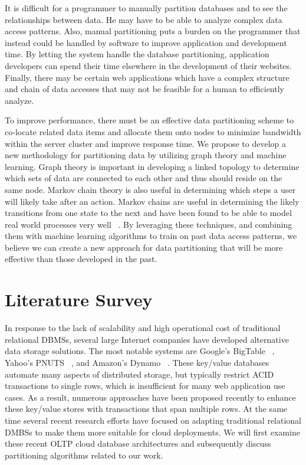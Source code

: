 \documentclass[10pt,final,journal]{IEEEtran}
\begin{document}
It is difficult for a programmer to manually partition databases and to see the relationships between data.  He may have to be able to analyze complex data access patterns. Also, manual partitioning puts a burden on the programmer that instead could be handled by software to improve application and development time. By letting the system handle the database partitioning, application developers can spend their time elsewhere in the development of their websites. Finally, there may be certain web applications which have a complex structure and chain of data accesses that may not be feasible for a human to efficiently analyze.

To improve performance, there must be an effective data partitioning scheme to co-locate related data items and allocate them onto nodes to minimize bandwidth within the server cluster and improve response time. We propose to develop a new methodology for partitioning data by utilizing graph theory and machine learning. Graph theory is important in developing a linked topology to determine which sets of data are connected to each other and thus should reside on the same node. Markov chain theory is also useful in determining which steps a user will likely take after an action. Markov chains are useful in determining the likely transitions from one state to the next and have been found to be able to model real world processes very well ~\cite{Gilks:1996}. By leveraging these techniques, and combining them with machine learning algorithms to train on past data access patterns, we believe we can create a new approach for data partitioning that will be more effective than those developed in the past.

\section{Literature Survey}
In response to the lack of scalability and high operational cost of traditional relational DBMSs, several large Internet companies have developed alternative data storage solutions. The most notable systems are Google's BigTable ~\cite{Chang:2006:BDS:1267308.1267323}, Yahoo's PNUTS ~\cite{Cooper:2008:PYH:1454159.1454167}, and Amazon's Dynamo ~\cite{DeCandia:2007:DAH:1323293.1294281}. These key/value databases automate many aspects of distributed storage, but typically restrict ACID transactions to single rows, which is insufficient for many web application use cases. As a result, numerous approaches have been proposed recently  to enhance these key/value stores with transactions that span multiple rows. At the same time several recent research efforts have focused on adapting traditional relational  DMBSs to make them more suitable for cloud deployments. We will first examine these recent OLTP cloud database architectures and subsequently discuss partitioning algorithms related to our work.
\end{document}
